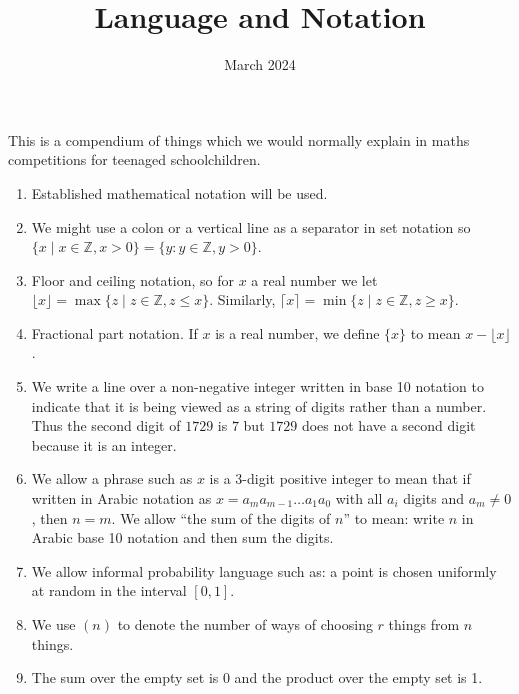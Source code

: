 \documentclass{article}
\title{Language and Notation}
\date{March 2024}
\begin{document}
\maketitle

This is a compendium of things which we would normally explain in maths competitions for teenaged schoolchildren.

\begin{enumerate}
    \item Established mathematical notation will be used.
    
    \item We might use a colon or a vertical line as a separator in set notation so $\{x \mid x \in \mathbb{Z}, x > 0\} = \{y : y \in \mathbb{Z}, y > 0\}$.
    
    \item Floor and ceiling notation, so for $x$ a real number we let $\lfloor x \rfloor = \max\{z \mid z \in \mathbb{Z}, z \leq x\}$. Similarly, $\lceil x \rceil = \min\{z \mid z \in \mathbb{Z}, z \geq x\}$.
    
    \item Fractional part notation. If $x$ is a real number, we define $\{x\}$ to mean $x - \lfloor x \rfloor$.
    
    \item We write a line over a non-negative integer written in base 10 notation to indicate that it is being viewed as a string of digits rather than a number. Thus the second digit of $1729$ is $7$ but $1729$ does not have a second digit because it is an integer.
    
    \item We allow a phrase such as $x$ is a 3-digit positive integer to mean that if written in Arabic notation as $x = a_m a_{m-1} \ldots a_1 a_0$ with all $a_i$ digits and $a_m \neq 0$, then $n = m$. We allow ``the sum of the digits of $n$'' to mean: write $n$ in Arabic base 10 notation and then sum the digits.
    
    \item We allow informal probability language such as: a point is chosen uniformly at random in the interval $[0,1]$.
    
    \item We use $(n)$ to denote the number of ways of choosing $r$ things from $n$ things.
    
    \item The sum over the empty set is 0 and the product over the empty set is 1.
    

\end{enumerate}
\end{document}
